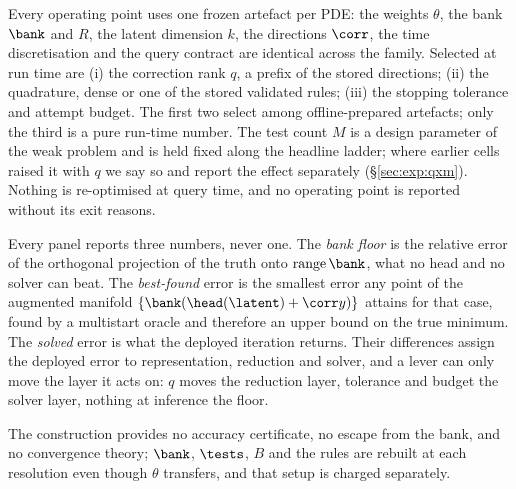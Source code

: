 Every operating point uses one frozen artefact per PDE: the weights $\theta$,
the bank $\bank$ and $R$, the latent dimension $k$, the directions $\corr$, the
time discretisation and the query contract are identical across the family.
Selected at run time are (i) the correction rank $q$, a prefix of the stored
directions; (ii) the quadrature, dense or one of the stored validated rules;
(iii) the stopping tolerance and attempt budget. The first two select among
offline-prepared artefacts; only the third is a pure run-time number. The test
count $M$ is a design parameter of the weak problem and is held fixed along the
headline ladder; where earlier cells raised it with $q$ we say so and report
the effect separately (\S\ref{sec:exp:qxm}). Nothing is re-optimised at query
time, and no operating point is reported without its exit reasons.

\label{sec:method:layers}
Every panel reports three numbers, never one. The \emph{bank floor} is the
relative error of the orthogonal projection of the truth onto
$\operatorname{range}\bank$, what no head and no solver can beat. The
\emph{best-found} error is the smallest error any point of the augmented
manifold $\{\bank(\head(\latent)+\corr y)\}$ attains for that case, found by a
multistart oracle and therefore an upper bound on the true minimum. The
\emph{solved} error is what the deployed iteration returns. Their differences
assign the deployed error to representation, reduction and solver, and a lever
can only move the layer it acts on: $q$ moves the reduction layer, tolerance
and budget the solver layer, nothing at inference the floor.

\label{sec:method:limits}
The construction provides no accuracy certificate, no escape from the bank, and
no convergence theory; $\bank$, $\tests$, $B$ and the rules are rebuilt at each
resolution even though $\theta$ transfers, and that setup is charged
separately.
